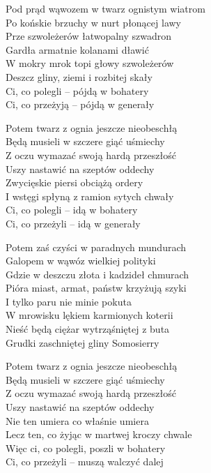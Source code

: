 \begin{text}
    Pod prąd wąwozem w twarz ognistym wiatrom\\
    Po końskie brzuchy w nurt płonącej lawy\\
    Prze szwoleżerów łatwopalny szwadron\\
    Gardła armatnie kolanami dławić\\
    W mokry mrok topi głowy szwoleżerów\\
    Deszcz gliny, ziemi i rozbitej skały\\
    Ci, co polegli – pójdą w bohatery\\
    Ci, co przeżyją – pójdą w generały

    Potem twarz z ognia jeszcze nieobeschłą\\
    Będą musieli w szczere giąć uśmiechy\\
    Z oczu wymazać swoją hardą przeszłość\\
    Uszy nastawić na szeptów oddechy\\
    Zwycięskie piersi obciążą ordery\\
    I wstęgi spłyną z ramion sytych chwały\\
    Ci, co polegli – idą w bohatery\\
    Ci, co przeżyli – idą w generały

    Potem zaś czyści w paradnych mundurach\\
    Galopem w wąwóz wielkiej polityki\\
    Gdzie w deszczu złota i kadzideł chmurach\\
    Pióra miast, armat, państw krzyżują szyki\\
    I tylko paru nie minie pokuta\\
    W mrowisku lękiem karmionych koterii\\
    Nieść będą ciężar wytrząśniętej z buta\\
    Grudki zaschniętej gliny Somosierry

    Potem twarz z ognia jeszcze nieobeschłą\\
    Będą musieli w szczere giąć uśmiechy\\
    Z oczu wymazać swoją hardą przeszłość\\
    Uszy nastawić na szeptów oddechy\\
    Nie ten umiera co właśnie umiera\\
    Lecz ten, co żyjąc w martwej kroczy chwale\\
    Więc ci, co polegli, poszli w bohatery\\
    Ci, co przeżyli – muszą walczyć dalej
\end{text}

